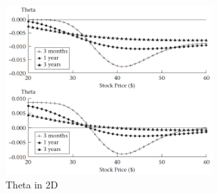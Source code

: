 \documentclass[hidelinks]{article}
\begin{document}
    \begin{figure}[!h]
	\centering
	
	\includegraphics[width=0.7\textwidth]{theta_2d.png}
	
	\caption{Theta in 2D}
	\label{fig:theta2d}
	\end{figure}
    
\end{document}
